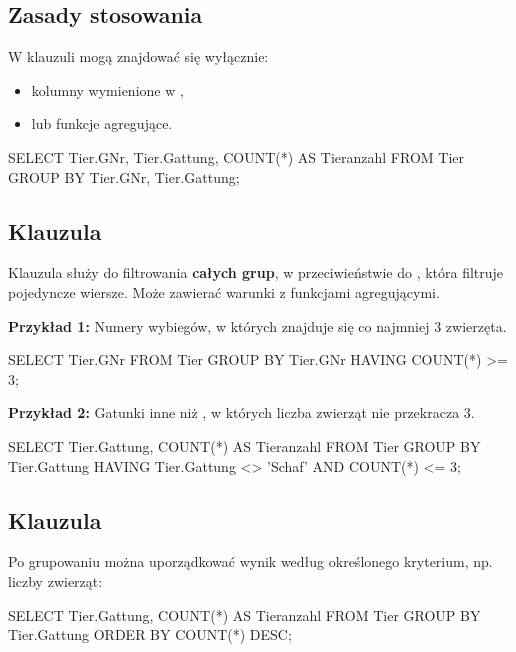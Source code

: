 \subsection{Zasady stosowania }
    W klauzuli  mogą znajdować się wyłącznie:
    \begin{itemize}
        \item kolumny wymienione w ,
        \item lub funkcje agregujące.
    \end{itemize}

    \begin{sql}
    SELECT Tier.GNr, Tier.Gattung, COUNT(*) AS Tieranzahl
    FROM Tier
    GROUP BY Tier.GNr, Tier.Gattung;
    \end{sql}

\subsection{Klauzula }
    Klauzula  służy do filtrowania \textbf{całych grup}, w przeciwieństwie do , która filtruje pojedyncze wiersze.  
    Może zawierać warunki z funkcjami agregującymi.

\begin{tcolorbox}[gray]
    \textbf{Przykład 1:} Numery wybiegów, w których znajduje się co najmniej 3 zwierzęta.
    \begin{sql}
    SELECT Tier.GNr
        FROM Tier
        GROUP BY Tier.GNr
        HAVING COUNT(*) >= 3;
    \end{sql}
\end{tcolorbox}

\begin{tcolorbox}[gray]
    \textbf{Przykład 2:} Gatunki inne niż , w których liczba zwierząt nie przekracza 3.
    \begin{sql}
    SELECT Tier.Gattung, COUNT(*) AS Tieranzahl
        FROM Tier
        GROUP BY Tier.Gattung
        HAVING Tier.Gattung <> 'Schaf' AND COUNT(*) <= 3;
    \end{sql}
\end{tcolorbox}

\subsection{Klauzula }
    Po grupowaniu można uporządkować wynik według określonego kryterium, np. liczby zwierząt:
    \begin{sql}
    SELECT Tier.Gattung, COUNT(*) AS Tieranzahl
        FROM Tier
        GROUP BY Tier.Gattung
        ORDER BY COUNT(*) DESC;
    \end{sql}

